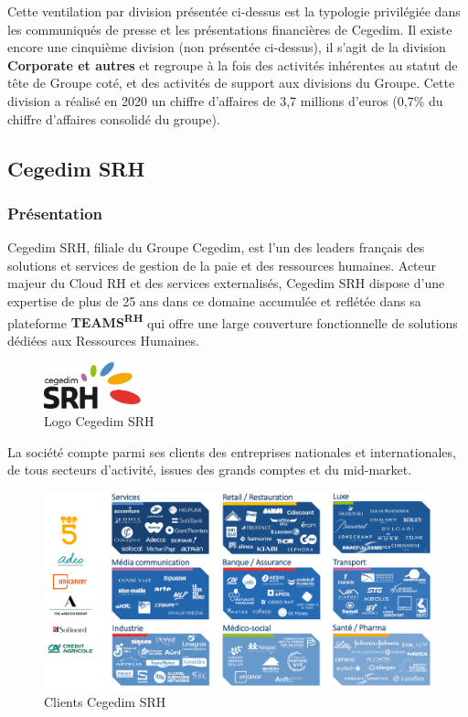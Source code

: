 \par\bigskip
\begin{beware}[title=Note : ]
Cette ventilation par division présentée ci-dessus est la typologie privilégiée dans les communiqués de presse et les présentations financières de Cegedim. Il existe encore une cinquième division (non présentée ci-dessus), il s'agit de la division \textbf{Corporate et autres} et regroupe à la fois des activités inhérentes au statut de tête de Groupe coté, et des activités de support aux divisions du Groupe.
Cette division a réalisé en 2020 un chiffre d'affaires de 3,7 millions d'euros
(0,7\% du chiffre d'affaires consolidé du groupe). 

\end{beware}
\subsection{Cegedim SRH}
\subsubsection{Présentation}
Cegedim SRH, filiale du Groupe Cegedim, est l'un des leaders français des solutions et services de gestion de la paie et des ressources humaines. Acteur majeur du Cloud RH et des services externalisés, 
Cegedim SRH dispose d'une expertise de plus de 25 ans dans ce domaine accumulée et reflétée dans sa plateforme \textbf{TEAMS\textsuperscript{RH}} qui offre une large couverture fonctionnelle de solutions dédiées aux Ressources Humaines.\\
\begin{figure}[H]
    \centering
    \includegraphics[width=0.25\textwidth]{images/sec1/cegedim-srh.pdf}
    \caption{Logo Cegedim SRH}
\end{figure}
La société compte parmi ses clients des entreprises nationales et internationales, de tous secteurs d’activité, issues des grands comptes et du mid-market.
\begin{figure}[H]
    \centering
    \includegraphics[width=\textwidth]{images/sec1/clients-cegedim-srh.pdf}
    \caption{Clients Cegedim SRH}
\end{figure}

